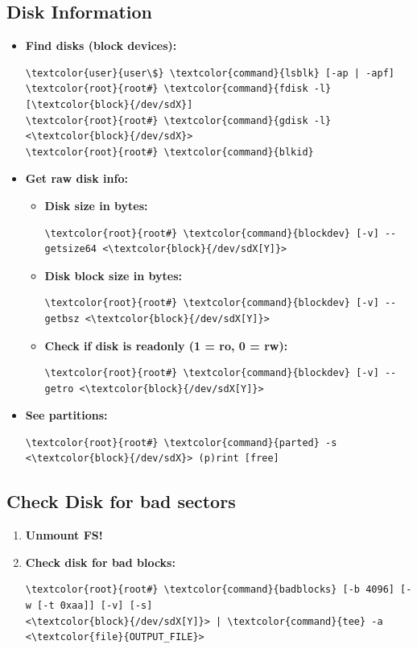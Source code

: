 \documentclass[10pt, a4paper, onecolumn, oneside, titlepage, openany]{book}
\begin{document}
\subsection{Disk Information}
\begin{itemize}
    \item \textbf{Find disks (block devices):}
\begin{Verbatim}[commandchars=\\\{\}]
\textcolor{user}{user\$} \textcolor{command}{lsblk} [-ap | -apf]
\textcolor{root}{root#} \textcolor{command}{fdisk -l} [\textcolor{block}{/dev/sdX}]
\textcolor{root}{root#} \textcolor{command}{gdisk -l} <\textcolor{block}{/dev/sdX}>
\textcolor{root}{root#} \textcolor{command}{blkid}
\end{Verbatim}
    \item \textbf{Get raw disk info:}
    \begin{itemize}
        \item \textbf{Disk size in bytes:}
\begin{Verbatim}[commandchars=\\\{\}]
\textcolor{root}{root#} \textcolor{command}{blockdev} [-v] --getsize64 <\textcolor{block}{/dev/sdX[Y]}>
\end{Verbatim}
    \item \textbf{Disk block size in bytes:}
\begin{Verbatim}[commandchars=\\\{\}]
\textcolor{root}{root#} \textcolor{command}{blockdev} [-v] --getbsz <\textcolor{block}{/dev/sdX[Y]}>
\end{Verbatim}
    \item \textbf{Check if disk is readonly (1 = ro, 0 = rw):}
\begin{Verbatim}[commandchars=\\\{\}]
\textcolor{root}{root#} \textcolor{command}{blockdev} [-v] --getro <\textcolor{block}{/dev/sdX[Y]}>
\end{Verbatim}
    \end{itemize}
    \item \textbf{See partitions:}
\begin{Verbatim}[commandchars=\\\{\}]
\textcolor{root}{root#} \textcolor{command}{parted} -s <\textcolor{block}{/dev/sdX}> (p)rint [free]
\end{Verbatim}
\end{itemize}
\subsection{Check Disk for bad sectors}
\begin{enumerate}
    \item \textbf{Unmount FS!}
    \item \textbf{Check disk for bad blocks:}
\begin{Verbatim}[commandchars=\\\{\}]
\textcolor{root}{root#} \textcolor{command}{badblocks} [-b 4096] [-w [-t 0xaa]] [-v] [-s]
<\textcolor{block}{/dev/sdX[Y]}> | \textcolor{command}{tee} -a <\textcolor{file}{OUTPUT_FILE}>
\end{Verbatim}
\end{enumerate}
\end{document}
